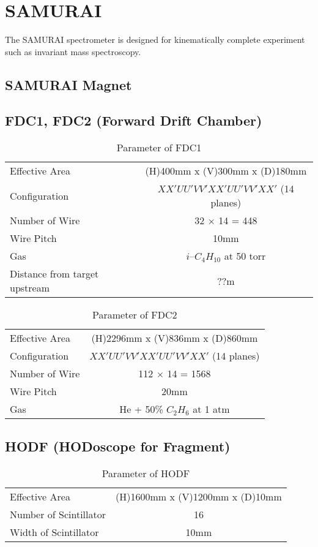 \section{SAMURAI}
The SAMURAI spectrometer is designed for kinematically complete experiment such as invariant mass spectroscopy. \cite{SAMURAIConcept} 
\subsection{SAMURAI Magnet}

\subsection{FDC1, FDC2 (Forward Drift Chamber)}
\begin{table}[h]
    \centering
    \begin{tabular}{l|c}
        \hline
        Effective Area & (H)400mm x (V)300mm x (D)180mm\\
        Configuration & $XX'UU'VV'XX'UU'VV'XX'$ (14 planes)\\
        Number of Wire & 32 $\times$ 14 = 448 \\
        Wire Pitch & 10mm \\
        Gas & $i$--${C}_{4} {H}_{10}$ at 50 torr\\
        Distance from target upstream & ??m \\
        \hline
    \end{tabular}
    \caption{Parameter of FDC1}
\end{table}
\begin{table}[h]
    \centering
    \begin{tabular}{l|c}
        \hline
        Effective Area & (H)2296mm x (V)836mm x (D)860mm\\
        Configuration & $XX'UU'VV'XX'UU'VV'XX'$ (14 planes)\\
        Number of Wire & 112 $\times$ 14 = 1568 \\
        Wire Pitch & 20mm \\
        Gas & He + 50\% ${C}_{2} {H}_{6}$ at 1 atm\\
        \hline
    \end{tabular}
    \caption{Parameter of FDC2}
\end{table}
\subsection{HODF (HODoscope for Fragment)}
\begin{table}[h]
    \centering
    \begin{tabular}{l|c}
        \hline
        Effective Area & (H)1600mm x (V)1200mm x (D)10mm\\
        Number of Scintillator & 16 \\
        Width of Scintillator & 10mm \\
        \hline
    \end{tabular}
    \caption{Parameter of HODF}
\end{table}

